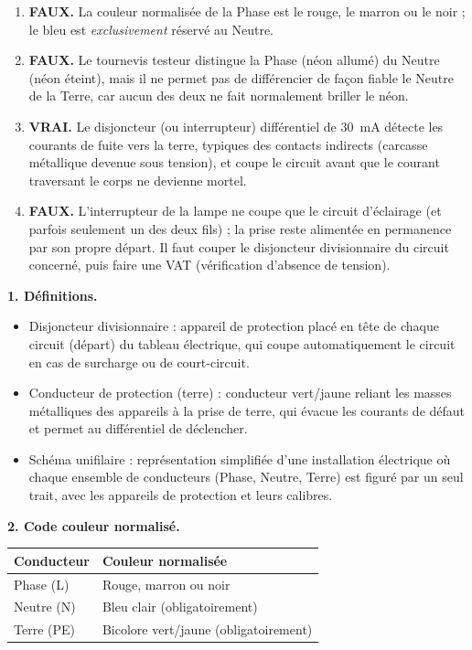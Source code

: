 \documentclass[11pt]{article}
\newcommand{\cle}[1]{{\popxbold\color{popdark}#1}}
\begin{document}
\begin{corrige}
\begin{enumerate}
\item \textbf{FAUX.} La couleur normalisée de la Phase est le rouge, le marron ou le noir ; le bleu est \emph{exclusivement} réservé au Neutre.
\item \textbf{FAUX.} Le tournevis testeur distingue la Phase (néon allumé) du Neutre (néon éteint), mais il ne permet pas de différencier de façon fiable le Neutre de la Terre, car aucun des deux ne fait normalement briller le néon.
\item \textbf{VRAI.} Le disjoncteur (ou interrupteur) différentiel de \SI{30}{mA} détecte les courants de fuite vers la terre, typiques des contacts indirects (carcasse métallique devenue sous tension), et coupe le circuit avant que le courant traversant le corps ne devienne mortel.
\item \textbf{FAUX.} L'interrupteur de la lampe ne coupe que le circuit d'éclairage (et parfois seulement un des deux fils) ; la prise reste alimentée en permanence par son propre départ. Il faut couper le disjoncteur divisionnaire du circuit concerné, puis faire une VAT (vérification d'absence de tension).
\end{enumerate}
\end{corrige}

\begin{corrige}
\textbf{1. Définitions.}
\begin{itemize}
\item \cle{Disjoncteur divisionnaire} : appareil de protection placé en tête de chaque circuit (départ) du tableau électrique, qui coupe automatiquement le circuit en cas de surcharge ou de court-circuit.
\item \cle{Conducteur de protection (terre)} : conducteur vert/jaune reliant les masses métalliques des appareils à la prise de terre, qui évacue les courants de défaut et permet au différentiel de déclencher.
\item \cle{Schéma unifilaire} : représentation simplifiée d'une installation électrique où chaque ensemble de conducteurs (Phase, Neutre, Terre) est figuré par un seul trait, avec les appareils de protection et leurs calibres.
\end{itemize}

\textbf{2. Code couleur normalisé.}
\begin{center}
\begin{tabularx}{\linewidth}{|l|X|}
\hline
\rowcolor{popblueL} \textbf{Conducteur} & \textbf{Couleur normalisée} \\
\hline
Phase (L) & Rouge, marron ou noir \\
\hline
Neutre (N) & Bleu clair (obligatoirement) \\
\hline
Terre (PE) & Bicolore vert/jaune (obligatoirement) \\
\hline
\end{tabularx}
\end{center}
\end{corrige}
\end{document}
